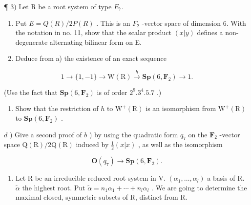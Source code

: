 ¶ 3) Let R be a root system of type \(E_{7}\).

\begin{enumerate}
\def\labelenumi{\alph{enumi})}
\item
  Put \(E = Q(R)/2P(R)\) . This is an \(F_{2}\) -vector space of dimension 6. With the notation in no. 11, show that the scalar product \((x|y)\) defines a non-degenerate alternating bilinear form on E.
\item
  Deduce from a) the existence of an exact sequence
\end{enumerate}

\[
1 \rightarrow \{1, - 1 \} \rightarrow \mathrm{W} (\mathrm{R}) \xrightarrow {h} \mathbf {S p} (6, \mathbf {F} _ {2}) \rightarrow 1.
\]

(Use the fact that \(\mathbf{Sp}(6,\mathbf{F}_2)\) is of order \(2^{9}.3^{4}.5.7\) .)

\begin{enumerate}
\def\labelenumi{\alph{enumi})}
\setcounter{enumi}{2}
\tightlist
\item
  Show that the restriction of \(h\) to \(\mathrm{W}^{+}(\mathrm{R})\) is an isomorphism from \(\mathrm{W}^{+}(\mathrm{R})\) to \(\mathbf{Sp}(6, \mathbf{F}_2)\) .
\end{enumerate}

\(d\) ) Give a second proof of \(b\) ) by using the quadratic form \(q_{7}\) on the \(\mathbf{F}_2\) -vector space \(\mathrm{Q(R) / 2Q(R)}\) induced by \(\frac{1}{2} (x|x)\) , as well as the isomorphism

\[
\mathbf {O} (q _ {7}) \rightarrow \mathbf {S p} (6, \mathbf {F} _ {2}).
\]

\begin{enumerate}
\def\labelenumi{\arabic{enumi})}
\setcounter{enumi}{3}
\tightlist
\item
  Let R be an irreducible reduced root system in V. \((\alpha_{1},\ldots,\alpha_{l})\) a basis of R. \(\tilde{\alpha}\) the highest root. Put \(\tilde{\alpha}=n_{1}\alpha_{1}+\cdots+n_{l}\alpha_{l}\) . We are going to determine the maximal closed, symmetric subsets of R, distinct from R.
\end{enumerate}

